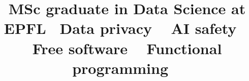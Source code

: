 \title{
  MSc graduate in Data Science at EPFL
  \newline
  \newline
  \normalsize{
    ~Data privacy%
    ~ AI safety%
    ~ Free software%
    ~ Functional programming%
    ~
  }
}
